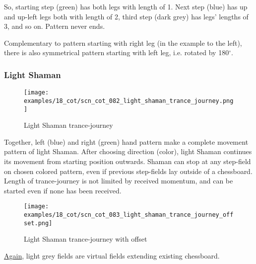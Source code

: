 So, starting step (green) has both legs with length of 1. Next step (blue)
has up and up-left legs both with length of 2, third step (dark grey) has
legs' lengths of 3, and so on. Pattern never ends.

Complementary to pattern starting with right leg (in the example to the
left), there is also symmetrical pattern starting with left leg, i.e.
rotated by 180$^{\circ}$. %

\clearpage %

\subsubsection*{Light Shaman}
\label{sec:Conquest of Tlalocan/Trance-journey/Movement/Light Shaman}

\vspace*{-1.4\baselineskip}
\noindent
\begin{figure}[!h]
\texttt{[image: examples/18\_cot/scn\_cot\_082\_light\_shaman\_trance\_journey.png]}
\vspace*{-1.3\baselineskip}
\caption{Light Shaman trance-journey}
\label{fig:scn_cot_082_light_shaman_trance_journey}
\end{figure}

\vspace*{-0.5\baselineskip}
Together, left (blue) and right (green) hand pattern make a complete movement
pattern of light Shaman. After choosing direction (color), light Shaman
continues its movement from starting position outwards. Shaman can stop at
any step-field on chosen colored pattern, even if previous step-fields lay
outside of a chessboard. Length of trance-journey is not limited by received
momentum, and can be started even if none has been received.

\clearpage %

\noindent
\begin{figure}[!h]
\texttt{[image: examples/18\_cot/scn\_cot\_083\_light\_shaman\_trance\_journey\_offset.png]}
\caption{Light Shaman trance-journey with offset}
\label{fig:scn_cot_083_light_shaman_trance_journey_offset}
\end{figure}

\hyperref[fig:scn_hd_06_centaur_off_board]{Again},
light grey fields are virtual fields extending existing chessboard.

